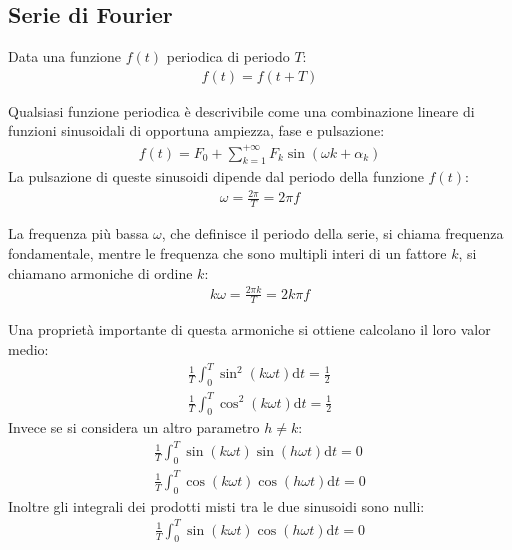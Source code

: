 \documentclass{article}
\newcommand{\df}{\mathrm{d}}
\numberwithin{equation}{subsection}
\begin{document}
\subsection{Serie di Fourier}

Data una funzione $f(t)$ periodica di periodo $T$:
\begin{gather*}
    f(t)=f(t+T)
\end{gather*}

Qualsiasi funzione periodica è descrivibile come una combinazione lineare di funzioni sinusoidali di opportuna ampiezza, fase e pulsazione:
\begin{gather}
    f(t)=F_0+\displaystyle\sum_{k=1}^{+\infty}F_k\sin(\omega k+\alpha_k)
\end{gather}
La pulsazione di queste sinusoidi dipende dal periodo della funzione $f(t)$:
\begin{gather*}
    \omega=\displaystyle\frac{2\pi}{T}=2\pi f
\end{gather*}

La frequenza più bassa $\omega$, che definisce il periodo della serie, si chiama frequenza fondamentale, mentre le frequenza che sono multipli interi 
di un fattore $k$, si chiamano armoniche di ordine $k$:
\begin{gather*}
    k\omega=\displaystyle\frac{2\pi k}{T}=2k\pi f
\end{gather*}

Una proprietà importante di questa armoniche si ottiene calcolano il loro valor medio:
\begin{gather*}
    \displaystyle\frac{1}{T}\int_0^T\sin^2(k\omega t)\df t=\frac{1}{2}\\
    \displaystyle\frac{1}{T}\int_0^T\cos^2(k\omega t)\df t=\frac{1}{2}
\end{gather*}
Invece se si considera un altro parametro $h\neq k$:
\begin{gather*}
    \displaystyle\frac{1}{T}\int_0^T\sin (k\omega t)\sin (h\omega t)\df t=0\\
    \displaystyle\frac{1}{T}\int_0^T\cos (k\omega t)\cos (h\omega t)\df t=0
\end{gather*}
Inoltre gli integrali dei prodotti misti tra le due sinusoidi sono nulli:
\begin{gather*}
    \displaystyle\frac{1}{T}\int_0^T\sin(k\omega t)\cos(h\omega t)\df t=0
\end{gather*}
\end{document}
